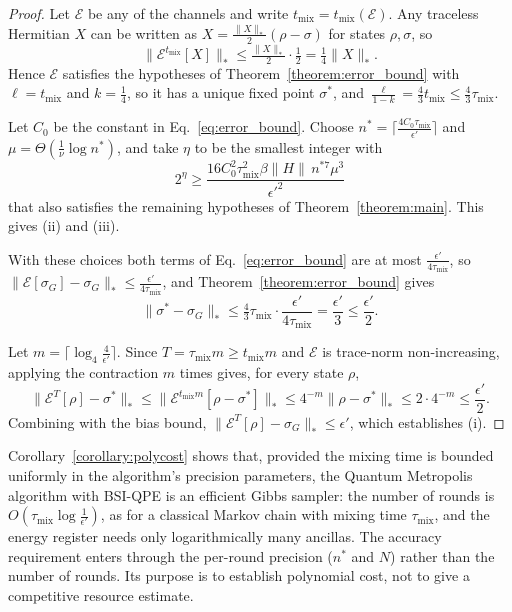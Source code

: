 \documentclass[aps,floatfix,10pt,amssymb,amsfont,amsmath,superscriptaddress,float,nofootinbib,longbibliography,nobalancelastpage,twocolumn]{revtex4-2}
\begin{document}
\begin{proof}
Let $\mathcal{E}$ be any of the channels and write $t_{\mathrm{mix}}=t_{\mathrm{mix}}(\mathcal{E})$. Any traceless Hermitian $X$ can be written as $X=\frac{\|X\|_*}{2}(\rho-\sigma)$ for states $\rho,\sigma$, so
\begin{equation}
    \|\mathcal{E}^{t_{\mathrm{mix}}}[X]\|_*\leq\tfrac{\|X\|_*}{2}\cdot\tfrac12=\tfrac14\|X\|_*.
\end{equation}
Hence $\mathcal{E}$ satisfies the hypotheses of Theorem~\ref{theorem:error_bound} with $\ell=t_{\mathrm{mix}}$ and $k=\frac14$, so it has a unique fixed point $\sigma^*$, and $\frac{\ell}{1-k}=\frac43 t_{\mathrm{mix}}\leq\frac43\tau_{\mathrm{mix}}$.

Let $C_0$ be the constant in Eq.~\eqref{eq:error_bound}. Choose $n^*=\lceil\frac{4C_0\tau_{\mathrm{mix}}}{\epsilon'}\rceil$ and $\mu=\Theta(\frac{1}{\nu}\log n^*)$, and take $\eta$ to be the smallest integer with
\begin{equation}
    2^{\eta}\geq\frac{16C_0^2\tau_{\mathrm{mix}}^2\beta\|H\|\,n^{*7}\mu^3}{\epsilon'^2}
\end{equation}
that also satisfies the remaining hypotheses of Theorem~\ref{theorem:main}. This gives (ii) and (iii).

With these choices both terms of Eq.~\eqref{eq:error_bound} are at most $\frac{\epsilon'}{4\tau_{\mathrm{mix}}}$, so $\|\mathcal{E}[\sigma_G]-\sigma_G\|_*\leq\frac{\epsilon'}{4\tau_{\mathrm{mix}}}$, and Theorem~\ref{theorem:error_bound} gives
\begin{equation}
    \|\sigma^*-\sigma_G\|_*\leq\tfrac43\tau_{\mathrm{mix}}\cdot\frac{\epsilon'}{4\tau_{\mathrm{mix}}}=\frac{\epsilon'}{3}\leq\frac{\epsilon'}{2}.
\end{equation}

Let $m=\lceil\log_4\frac{4}{\epsilon'}\rceil$. Since $T=\tau_{\mathrm{mix}}m\geq t_{\mathrm{mix}}m$ and $\mathcal{E}$ is trace-norm non-increasing, applying the contraction $m$ times gives, for every state $\rho$,
\begin{equation}
    \|\mathcal{E}^T[\rho]-\sigma^*\|_*\leq\|\mathcal{E}^{t_{\mathrm{mix}}m}[\rho-\sigma^*]\|_*\leq 4^{-m}\|\rho-\sigma^*\|_*\leq 2\cdot4^{-m}\leq\frac{\epsilon'}{2}.
\end{equation}
Combining with the bias bound, $\|\mathcal{E}^T[\rho]-\sigma_G\|_*\leq\epsilon'$, which establishes (i).
\end{proof}

Corollary~\ref{corollary:polycost} shows that, provided the mixing time is bounded uniformly in the algorithm's precision parameters, the Quantum Metropolis algorithm with BSI-QPE is an efficient Gibbs sampler: the number of rounds is $O(\tau_{\mathrm{mix}}\log\frac{1}{\epsilon'})$, as for a classical Markov chain with mixing time $\tau_{\mathrm{mix}}$, and the energy register needs only logarithmically many ancillas. The accuracy requirement enters through the per-round precision ($n^*$ and $N$) rather than the number of rounds. Its purpose is to establish polynomial cost, not to give a competitive resource estimate. 
\end{document}
